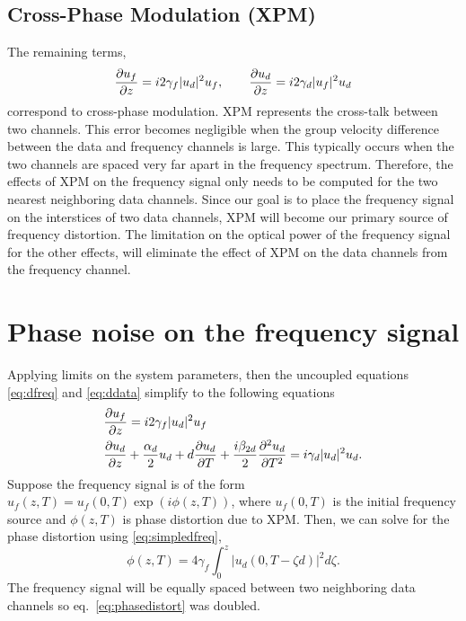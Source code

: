 \subsection{Cross-Phase Modulation (XPM)}

The remaining terms,
\begin{equation*}
\frac{\partial u_f}{\partial z} = i2\gamma_f|u_d|^2u_f, \qquad \frac{\partial u_d}{\partial z} = i2\gamma_d|u_f|^2u_d
\end{equation*}
correspond to cross-phase modulation. XPM represents the cross-talk between two channels. This error becomes negligible when the group velocity difference between the data and frequency channels is large. This typically occurs when the two channels are spaced very far apart in the frequency spectrum. Therefore, the effects of XPM on the frequency signal only needs to be computed for the two nearest neighboring data channels. Since our goal is to place the frequency signal on the interstices of two data channels, XPM will become our primary source of frequency distortion. The limitation on the optical power of the frequency signal for the other effects, will eliminate the effect of XPM on the data channels from the frequency channel.

\section{Phase noise on the frequency signal} \label{sec:noisexpm}

Applying limits on the system parameters, then the uncoupled equations \ref{eq:dfreq} and \ref{eq:ddata} simplify to the following equations
%
\begin{align}
\label{eq:simpledfreq}
&\frac{\partial u_f}{\partial z} = i2\gamma_f|u_d|^2u_f \\
\label{eq:simpleddata}
&\frac{\partial u_d}{\partial z} + \frac{\alpha_d}{2}u_d + d\frac{\partial u_d}{\partial T} + \frac{i\beta_{2d}}{2}\frac{\partial ^2u_d}{\partial T^2} = i\gamma_d|u_d|^2u_d.
\end{align}
%
Suppose the frequency signal is of the form $u_f(z,T) = u_f(0,T)\exp(i\phi(z,T))$, where $u_f(0,T)$ is the initial frequency source and $\phi(z,T)$ is phase distortion due to XPM. Then, we can solve for the phase distortion using \ref{eq:simpledfreq},
%
\begin{equation} \label{eq:phasedistort}
	\phi(z,T) = 4\gamma_f\int_0^z |u_d(0, T-\zeta d)|^2 d\zeta.
\end{equation}
%
The frequency signal will be equally spaced between two neighboring data channels so eq.~\ref{eq:phasedistort} was doubled.


